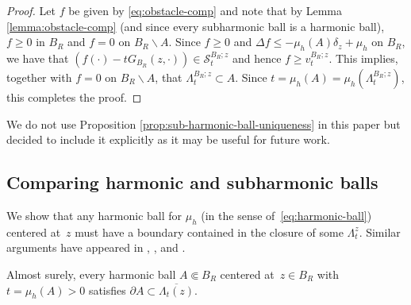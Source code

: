 \documentclass[12pt]{amsart}
\numberwithin{equation}{section}
\newcommand{\mclS}[2]{\hyperref[eq:super-solutions]{\mathcal{S}^{#1}_{#2}}}
\newcommand{\cluster}[2]{\hyperref[eq:non-co-set]{\mathit{\Lambda}^{#1}_{#2}}}
\newcommand{\regcluster}[2]{\hyperref[eq:regular-cluster]{\Lambda^{#1}_{#2}}}
\newcommand{\odometer}[2]{\hyperref[eq:limit-odometer]{v^{#1}_{#2}}}
\begin{document}
	\begin{proof}
		Let $f$ be given by \eqref{eq:obstacle-comp} and note that by Lemma \ref{lemma:obstacle-comp} (and since every subharmonic ball is a harmonic ball), 
		$f  \geq 0$ in $B_R$ and $f = 0$ on $B_R \backslash A$.  Since $f \geq 0$ and $\Delta f \leq -\mu_h(A) \delta_z + \mu_h$ on $B_R$, we have that $(f(\cdot)- t G_{B_R}(z,\cdot)) \in \mclS{B_R; z}{t}$ and hence $f \geq \odometer{B_R; z}{t}$. This implies, together with $f = 0$ on $B_R \backslash A$, that  $\cluster{B_R; z}{t} \subset A$. 
		Since $t = \mu_h(A) = \mu_h({\regcluster{B_R; z}{t}})$, this completes the proof. 
	\end{proof}
	
	
	We do not use Proposition \ref{prop:sub-harmonic-ball-uniqueness} in this paper but decided to include it explicitly as it may be useful for future work. 
	
	
	
	\subsection{Comparing harmonic and subharmonic balls}
	
	We show that any harmonic ball for $\mu_h$ (in the sense of~\eqref{eq:harmonic-ball}) centered at~$z$ must have a boundary contained in the closure of 
	some ${\regcluster{z}{t}}$. Similar arguments have appeared in \cite[Proposition 3.2]{shahgholian2013harmonic},
	\cite[Proposition 2.5]{hedenmalm2002hele}, and \cite[Section 3]{gustafsson1990onquadraturedomains}. 
	\begin{lemma}\label{lemma:contains-boundary}
		Almost surely, every harmonic ball  $A \Subset B_R$ centered at~$z \in B_R$ with $t = \mu_h(A) > 0$  satisfies $\partial A \subset \overline{{\regcluster{}{t}}(z)}$.
	\end{lemma}
	
\end{document}
